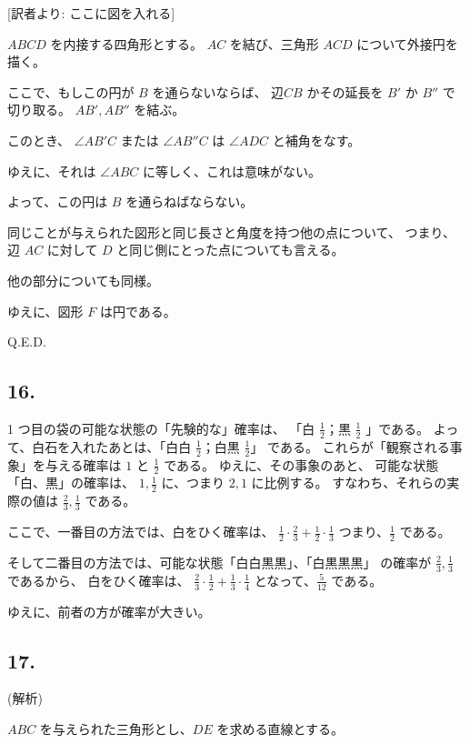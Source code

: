 [訳者より: ここに図を入れる]

$ABCD$ を内接する四角形とする。
$AC$ を結び、三角形 $ACD$ について外接円を描く。

ここで、もしこの円が $B$ を通らないならば、
辺$CB$ かその延長を $B'$ か $B''$ で切り取る。
$AB', AB''$ を結ぶ。

このとき、
$\angle AB'C$ または $\angle AB''C$ は $\angle ADC$ と補角をなす。

ゆえに、それは $\angle ABC$ に等しく、これは意味がない。

よって、この円は $B$ を通らねばならない。

同じことが与えられた図形と同じ長さと角度を持つ他の点について、
つまり、
辺 $AC$ に対して $D$ と同じ側にとった点についても言える。

他の部分についても同様。

ゆえに、図形 $F$ は円である。

Q.E.D.



\subsection*{16.}

 1 つ目の袋の可能な状態の「先験的な」確率は、
「白 $\frac{1}{2}$；黒 $\frac{1}{2}$ 」である。
よって、白石を入れたあとは、「白白 $\frac{1}{2}$；白黒 $\frac{1}{2}$」 である。
これらが「観察される事象」を与える確率は $1$ と $\frac{1}{2}$ である。
ゆえに、その事象のあと、
可能な状態「白、黒」の確率は、
$1, \frac{1}{2}$ に、つまり $2, 1$ に比例する。
すなわち、それらの実際の値は $\frac{2}{3}, \frac{1}{3}$ である。

ここで、一番目の方法では、白をひく確率は、
$\frac{1}{2} \cdot \frac{2}{3} + \frac{1}{2} \cdot \frac{1}{3}$
つまり、$\frac{1}{2}$ である。

そして二番目の方法では、可能な状態「白白黒黒」、「白黒黒黒」
の確率が $\frac{2}{3}, \frac{1}{3}$ であるから、
白をひく確率は、
$\frac{2}{3} \cdot \frac{1}{2} + \frac{1}{3} \cdot \frac{1}{4}$
となって、$\frac{5}{12}$ である。

ゆえに、前者の方が確率が大きい。

\subsection*{17.}

(解析)

$ABC$ を与えられた三角形とし、$DE$ を求める直線とする。

